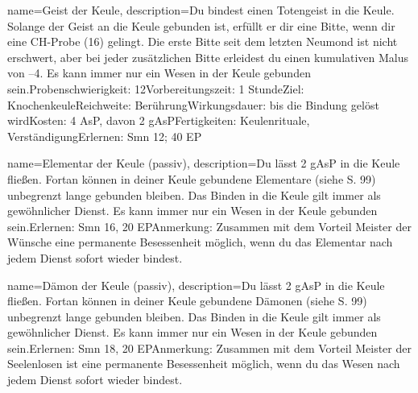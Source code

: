 {
    name={Geist der Keule},
    description={Du bindest einen Totengeist in die Keule. Solange der Geist an die Keule gebunden ist, erfüllt er dir eine Bitte, wenn dir eine CH-Probe (16) gelingt. Die erste Bitte seit dem letzten Neumond ist nicht erschwert, aber bei jeder zusätzlichen Bitte erleidest du einen kumulativen Malus von –4. Es kann immer nur ein Wesen in der Keule gebunden sein.\newline Probenschwierigkeit: 12\newline Vorbereitungszeit: 1 Stunde\newline Ziel: Knochenkeule\newline Reichweite: Berührung\newline Wirkungsdauer: bis die Bindung gelöst wird\newline Kosten: 4 AsP, davon 2 gAsP\newline Fertigkeiten: Keulenrituale, Verständigung\newline Erlernen: Smn 12; 40 EP}
}


{
    name={Elementar der Keule (passiv)},
    description={Du lässt 2 gAsP in die Keule fließen. Fortan können in deiner Keule gebundene Elementare (siehe S. 99) unbegrenzt lange gebunden bleiben. Das Binden in die Keule gilt immer als gewöhnlicher Dienst. Es kann immer nur ein Wesen in der Keule gebunden sein.\newline Erlernen: Smn 16, 20 EP\newline Anmerkung: Zusammen mit dem Vorteil Meister der Wünsche eine permanente Besessenheit möglich, wenn du das Elementar nach jedem Dienst sofort wieder bindest.}
}


{
    name={Dämon der Keule (passiv)},
    description={Du lässt 2 gAsP in die Keule fließen. Fortan können in deiner Keule gebundene Dämonen (siehe S. 99) unbegrenzt lange gebunden bleiben. Das Binden in die Keule gilt immer als gewöhnlicher Dienst. Es kann immer nur ein Wesen in der Keule gebunden sein.\newline Erlernen: Smn 18, 20 EP\newline Anmerkung: Zusammen mit dem Vorteil Meister der Seelenlosen ist eine permanente Besessenheit möglich, wenn du das Wesen nach jedem Dienst sofort wieder bindest.}
}


